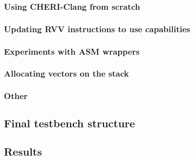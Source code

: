 \subsubsection{Using CHERI-Clang from scratch}
\subsubsection{Updating RVV instructions to use capabilities}
\subsubsection{Experiments with ASM wrappers}
\subsubsection{Allocating vectors on the stack}
\subsubsection{Other}


\subsection{Final testbench structure}

\subsection{Results}